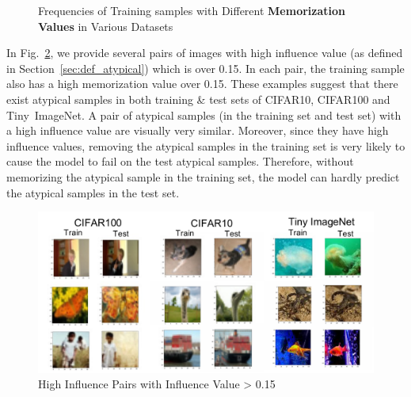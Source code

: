 \begin{figure}[h]
{\begin{minipage}[c]{0.3\textwidth}
\end{minipage}
}
\hspace*{0.0cm}
\caption{Frequencies of Training samples with Different \textbf{Memorization Values} in Various Datasets}
\label{fig:hist}
\end{figure}


In Fig.~\ref{fig:show_pair}, we provide several pairs of images with high influence value (as defined in Section~\ref{sec:def_atypical}) which is over 0.15. In each pair, the training sample also has a high memorization value over 0.15. These examples suggest that there exist atypical samples in both training \& test sets of CIFAR10, CIFAR100 and Tiny~ImageNet. A pair of atypical samples (in the training set and test set) with a high influence value are visually very similar. Moreover, since they have high influence values, removing the atypical samples in the training set is very likely to cause the model to fail on the test atypical samples. Therefore, without memorizing the atypical sample in the training set, the model can hardly predict the atypical samples in the test set.
\begin{figure}[h]
    \centering
    \includegraphics[width = 0.75\linewidth]{figures/pair.pdf}
    \caption{High Influence Pairs with Influence Value > 0.15}
    \label{fig:show_pair}
\end{figure}




